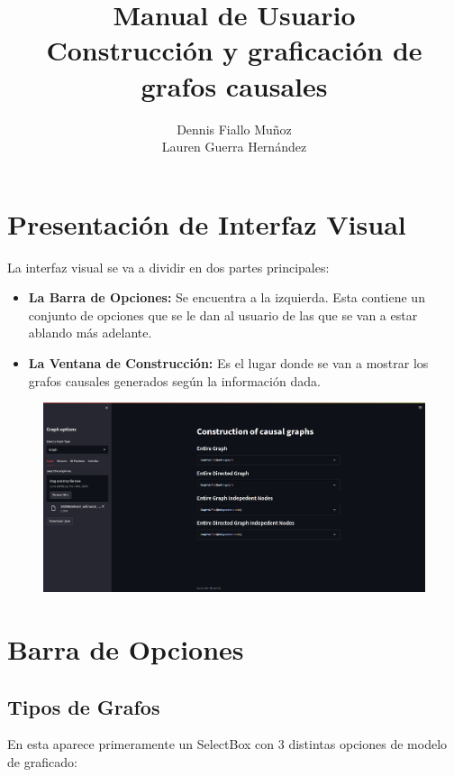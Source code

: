 \documentclass[spanish]{article}
\title{Manual de Usuario\\
    \large Construcción y graficación de grafos causales}
\author{ Dennis Fiallo Muñoz \\ Lauren Guerra Hernández}
\date{}
\begin{document}
\maketitle

\section*{Presentación de Interfaz Visual}

La interfaz visual se va a dividir en dos partes principales:
\begin{itemize}
    \item \textbf{La Barra de Opciones:} Se encuentra a la izquierda. Esta contiene un conjunto de opciones que se le dan al usuario de las que se van a estar ablando más adelante.
    \item \textbf{La Ventana de Construcción:} Es el lugar donde se van a mostrar los grafos causales generados según la información dada.
\end{itemize}

\begin{figure}[H]
    \includegraphics[scale=0.20]{visual.png}
\end{figure}	


\section*{Barra de Opciones}

\subsection*{Tipos de Grafos}
En esta aparece primeramente un SelectBox con 3 distintas opciones de modelo de graficado:
\end{document}
